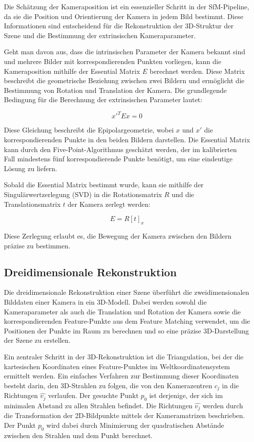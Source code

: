 Die Schätzung der Kameraposition ist ein essenzieller Schritt in der SfM-Pipeline, da sie die Position und Orientierung der Kamera in jedem Bild bestimmt. Diese Informationen sind entscheidend für die Rekonstruktion der 3D-Struktur der Szene und die Bestimmung der extrinsischen Kameraparameter.

Geht man davon aus, dass die intrinsischen Parameter der Kamera bekannt sind und mehrere Bilder mit korrespondierenden Punkten vorliegen, kann die Kameraposition mithilfe der Essential Matrix \(E\) berechnet werden. Diese Matrix beschreibt die geometrische Beziehung zwischen zwei Bildern und ermöglicht die Bestimmung von Rotation und Translation der Kamera. Die grundlegende Bedingung für die Berechnung der extrinsischen Parameter lautet:

\begin{equation}
x'^T E x = 0
\end{equation}

Diese Gleichung beschreibt die Epipolargeometrie, wobei \( x \) und \( x' \) die korrespondierenden Punkte in den beiden Bildern darstellen. Die Essential Matrix kann durch den Five-Point-Algorithmus geschätzt werden, der im kalibrierten Fall mindestens fünf korrespondierende Punkte benötigt, um eine eindeutige Lösung zu liefern.

Sobald die Essential Matrix bestimmt wurde, kann sie mithilfe der Singulärwertzerlegung (SVD) in die Rotationsmatrix \( R \) und die Translationsmatrix \( t \) der Kamera zerlegt werden:

\begin{equation}
E = R [t]_x
\end{equation}

Diese Zerlegung erlaubt es, die Bewegung der Kamera zwischen den Bildern präzise zu bestimmen.

\subsection{Dreidimensionale Rekonstruktion}

Die dreidimensionale Rekonstruktion einer Szene überführt die zweidimensionalen Bilddaten einer Kamera in ein 3D-Modell. Dabei werden sowohl die Kameraparameter als auch die Translation und Rotation der Kamera sowie die korrespondierenden Feature-Punkte aus dem Feature Matching verwendet, um die Positionen der Punkte im Raum zu berechnen und so eine präzise 3D-Darstellung der Szene zu erstellen.

Ein zentraler Schritt in der 3D-Rekonstruktion ist die Triangulation, bei der die kartesischen Koordinaten eines Feature-Punktes im Weltkoordinatensystem ermittelt werden. Ein einfaches Verfahren zur Bestimmung dieser Koordinaten besteht darin, den 3D-Strahlen zu folgen, die von den Kamerazentren \( c_j \) in die Richtungen \( \hat{v_j} \) verlaufen. Der gesuchte Punkt \( p_0 \) ist derjenige, der sich im minimalen Abstand zu allen Strahlen befindet. Die Richtungen \( \hat{v_j} \) werden durch die Transformation der 2D-Bildpunkte mittels der Kameramatrizen beschrieben. Der Punkt \( p_0 \) wird dabei durch Minimierung der quadratischen Abstände zwischen den Strahlen und dem Punkt berechnet.

